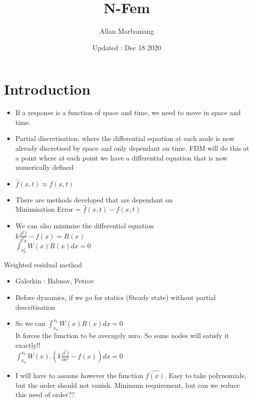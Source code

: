 

\title{N-Fem}
\author{Allan Marbaniang}
\date{Updated : Dec 18 2020}
\maketitle






\section{Introduction}

	\begin{frame}
		\begin{itemize}
			\item If a response is a function of space and time, we need to move in space and time.
			\item Partial discretisation, where the differential equation at each node is now already discretised by space and only dependant on time. FDM will do this at a  point where at each point we have a differential equation that is now numerically defined
			\item $\hat{f}(x,t) \approx f(x,t)$
			\item There are methods developed that are dependant on \\
			 Minimisation Error  = $\hat{f}(x,t) - f(x,t)$ \\
			 \item We can also minimise the differential equation \\
			  $k \frac{\partial^2 \hat{f}}{\partial^2 x} - f(x) = R(x) $\\
			 $\int_{x_a^e} W(x)R(x) dx = 0$
			
		\end{itemize}
	\end{frame}


	\begin{frame}{Weighted residual method}
		\begin{itemize}
			\item Galerkin : Babnov, Petrov
			\item Before dynamics, if we go for statics (Steady state) without partial descritisation
			\item So we can	$\int_{x_a}^{x_b} W(x)R(x) dx = 0$ \\
			It forces the function to be averagely zero. So some nodes will satisfy it exactly!!\\
				$\int_{x_a}^{x_b} W(x).\left(k \frac{\partial^2 \hat{f}}{\partial x^2} - f(x)  \right) dx = 0$ \\
			\item I will have to assume however the function $\hat{f(x)}$. Easy to take polynomials, but the order should not vanish.  Minimum requirement, but can we reduce this need of order??
		\end{itemize}
	\end{frame}


